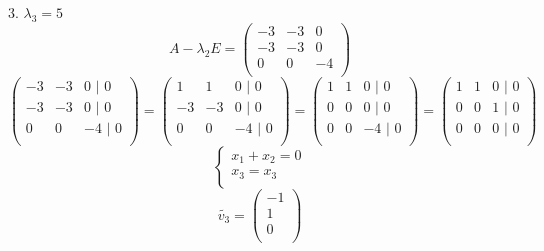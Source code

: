 \documentclass{article}
\begin{document}
    3. $\lambda_3 = 5$
    \begin{equation*}
    A -\lambda_2 E = 
        \begin{pmatrix}
            -3& -3& 0 \\
            -3& -3& 0 \\
            0& 0& -4  \\
        \end{pmatrix}
        \end{equation*}
        \begin{equation*}
        \begin{pmatrix}
            -3& -3& 0 \text{ |  0}\\
            -3& -3& 0 \text{ |  0}\\
            0& 0& -4  \text{ |  0}\\
        \end{pmatrix}
         =
         \begin{pmatrix}
            1& 1& 0 \text{ |  0}\\
            -3& -3& 0 \text{ |  0}\\
            0& 0& -4 \text{ |  0}\\
        \end{pmatrix}
        =
        \begin{pmatrix}
            1& 1& 0 \text{ |  0}\\
            0& 0& 0 \text{ |  0}\\
            0& 0& -4 \text{ |  0}\\
        \end{pmatrix}
        =
        \begin{pmatrix}
            1& 1& 0 \text{ |  0}\\
            0& 0& 1 \text{ |  0}\\
            0& 0& 0 \text{ |  0}\\
        \end{pmatrix}
    \end{equation*}
       \begin{equation*}
        \begin{cases}
            x_1 + x_2 = 0 \\
            x_3 = x_3 \\
        \end{cases}
    \end{equation*}
    \begin{equation*}
    \widetilde{v_3} = 
        \begin{pmatrix}
            -1\\
            1 \\
            0  \\
        \end{pmatrix}
    \end{equation*}
\end{document}

